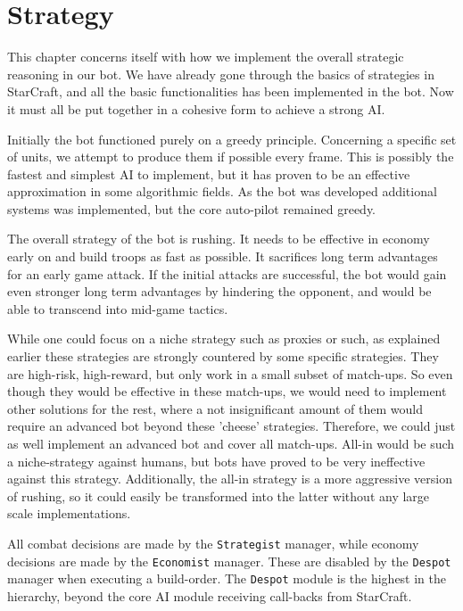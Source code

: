 \chapter{Strategy}
\label{ch:strategy}
This chapter concerns itself with how we implement the overall strategic reasoning in our bot. We have already gone through the basics of strategies in StarCraft, and all the basic functionalities has been implemented in the bot. Now it must all be put together in a cohesive form to achieve a strong AI.

Initially the bot functioned purely on a greedy principle. Concerning a specific set of units, we attempt to produce them if possible every frame. This is possibly the fastest and simplest AI to implement, but it has proven to be an effective approximation in some algorithmic fields. As the bot was developed additional systems was implemented, but the core auto-pilot remained greedy.

The overall strategy of the bot is rushing. It needs to be effective in economy early on and build troops as fast as possible. It sacrifices long term advantages for an early game attack. If the initial attacks are successful, the bot would gain even stronger long term advantages by hindering the opponent, and would be able to transcend into mid-game tactics.

While one could focus on a niche strategy such as proxies or such, as explained earlier these strategies are strongly countered by some specific strategies. They are high-risk, high-reward, but only work in  a small subset of match-ups. So even though they would be effective in these match-ups, we would need to implement other solutions for the rest, where a not insignificant amount of them would require an advanced bot beyond these 'cheese' strategies. Therefore, we could just as well implement an advanced bot and cover all match-ups. All-in would be such a niche-strategy against humans, but bots have proved to be very ineffective against this strategy. Additionally, the all-in strategy is a more aggressive version of rushing, so it could easily be transformed into the latter without any large scale implementations.

All combat decisions are made by the \texttt{Strategist} manager, while economy decisions are made by the \texttt{Economist} manager. These are disabled by the \texttt{Despot} manager when executing a build-order. The \texttt{Despot} module is the highest in the hierarchy, beyond the core AI module receiving call-backs from StarCraft.


